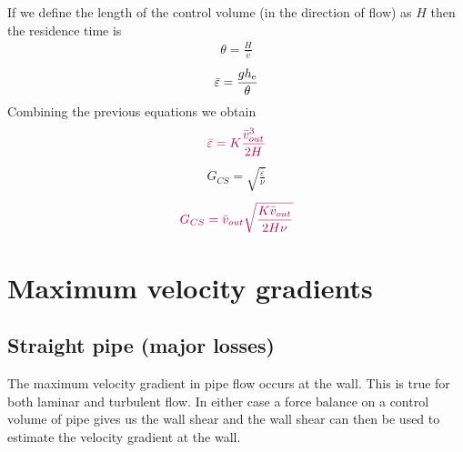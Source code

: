 \documentclass[letterpaper,10pt,english]{sphinxmanual}
\begin{document}
If we define the length of the control volume (in the direction of flow) as \(H\) then the residence time is
\begin{equation}\label{equation:Rapid_Mix/RM_Derivations:Rapid_Mix/RM_Derivations:69}
\begin{split}\theta = \frac{H}{\bar v}\end{split}
\end{equation}\begin{equation}\label{equation:Rapid_Mix/RM_Derivations:Rapid_Mix/RM_Derivations:70}
\begin{split}\bar\varepsilon = \frac{gh_{\rm{e}}}{\theta}\end{split}
\end{equation}
Combining the previous equations we obtain
\begin{equation}\label{equation:Rapid_Mix/RM_Derivations:Rapid_Mix/RM_Derivations:71}
\begin{split}\color{purple}{
  \bar\varepsilon = K\frac{\bar v_{out}^3}{2H}
}\end{split}
\end{equation}\begin{equation}\label{equation:Rapid_Mix/RM_Derivations:Rapid_Mix/RM_Derivations:72}
\begin{split}G_{CS} = \sqrt{\frac{\bar \varepsilon}{\nu}}\end{split}
\end{equation}\begin{equation}\label{equation:Rapid_Mix/RM_Derivations:Rapid_Mix/RM_Derivations:73}
\begin{split}\color{purple}{
  G_{CS} = \bar v_{out}\sqrt{\frac{K\bar v_{out}}{2H\nu}}
}\end{split}
\end{equation}

\section{Maximum velocity gradients}
\label{\detokenize{Rapid_Mix/RM_Derivations:maximum-velocity-gradients}}\label{\detokenize{Rapid_Mix/RM_Derivations:heading-maximum-velocity-gradients}}

\subsection{Straight pipe (major losses)}
\label{\detokenize{Rapid_Mix/RM_Derivations:straight-pipe-major-losses}}\label{\detokenize{Rapid_Mix/RM_Derivations:heading-straight-pipe-major-losses}}
The maximum velocity gradient in pipe flow occurs at the wall. This is true for both laminar and turbulent flow. In either case a force balance on a control volume of pipe gives us the wall shear and the wall shear can then be used to estimate the velocity gradient at the wall.
\end{document}
